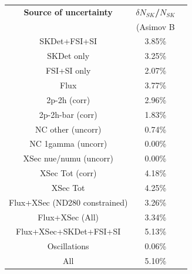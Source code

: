 \begin{table}[htb]
\centering
\begin{tabular}{| c | c | c |}
\hline
  {\bf Source of uncertainty}    & \multicolumn{1}{c|}{{\bf ${\delta}N_{SK}$/$N_{SK}$}}\\
                                 & \multicolumn{1}{c|}{(Asimov B}\\

\hline
\hline  
SKDet+FSI+SI                   & 3.85\%                        \\
SKDet only                   & 3.25\%                        \\
FSI+SI only                   & 2.07\%                        \\
\hline
  Flux                           & 3.77\%                        \\
\hline
\hline
  2p-2h (corr)                     & 2.96\%                        \\
  2p-2h-bar (corr)                  & 1.83\%                        \\
  NC other (uncorr)              & 0.74\%                        \\
  NC 1gamma (uncorr)             & 0.00\%                        \\
  XSec nue/numu (uncorr)                  & 0.00\%                        \\
\hline
  XSec Tot (corr)                  & 4.18\%                        \\
  XSec Tot                       & 4.25\%                        \\
\hline
\hline
  Flux+XSec (ND280 constrained)                      & 3.26\%                        \\
  Flux+XSec (All)	                    & 3.34\%                        \\
\hline
\hline
  Flux+XSec+SKDet+FSI+SI         & 5.13\%     \\
\hline
\hline
  Oscillations                   & 0.06\%                        \\
\hline
\hline
  All                            & 5.10\%                        \\
\hline
\hline


\end{tabular}
\end{table}
